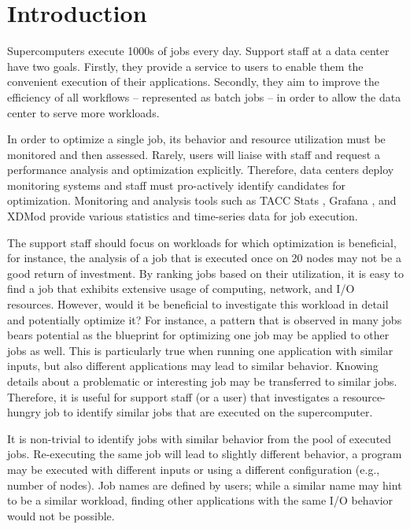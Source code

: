 \documentclass{jhps}
\begin{document}
\section{Introduction}

Supercomputers execute 1000s of jobs every day.
Support staff at a data center have two goals.
Firstly, they provide a service to users to enable them the convenient execution of their applications.
Secondly, they aim to improve the efficiency of all workflows -- represented as batch jobs -- in order to allow the data center to serve more workloads.

In order to optimize a single job, its behavior and resource utilization must be monitored and then assessed.
Rarely, users will liaise with staff and request a performance analysis and optimization explicitly.
Therefore, data centers deploy monitoring systems and staff must pro-actively identify candidates for optimization.
Monitoring and analysis tools such as TACC Stats \cite{evans2014comprehensive}, Grafana \cite{chan2019resource}, and XDMod \cite{simakov2018workload} provide various statistics and time-series data for job execution.

The support staff should focus on workloads for which optimization is beneficial, for instance, the analysis of a job that is executed once on 20 nodes may not be a good return of investment.
By ranking jobs based on their utilization, it is easy to find a job that exhibits extensive usage of computing, network, and I/O resources.
However, would it be beneficial to investigate this workload in detail and potentially optimize it?
For instance, a pattern that is observed in many jobs bears potential as the blueprint for optimizing one job may be applied to other jobs as well.
This is particularly true when running one application with similar inputs, but also different applications may lead to similar behavior.
Knowing details about a problematic or interesting job may be transferred to similar jobs.
Therefore, it is useful for support staff (or a user) that investigates a resource-hungry job to identify similar jobs that are executed on the supercomputer.

It is non-trivial to identify jobs with similar behavior from the pool of executed jobs.
Re-executing the same job will lead to slightly different behavior, a program may be executed with different inputs or using a different configuration (e.g., number of nodes).
Job names are defined by users; while a similar name may hint to be a similar workload, finding other applications with the same I/O behavior would not be possible.
\end{document}
